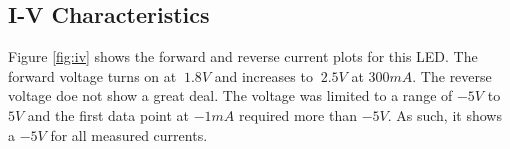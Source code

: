 \subsection{I-V Characteristics}
\label{sec:test:iv}

%



Figure \ref{fig:iv} shows the forward and reverse current plots for this LED. The forward voltage turns on at $~1.8V$ and increases to $~2.5V$ at $300mA$. The reverse voltage doe not show a great deal. The voltage was limited to a range of $-5V$ to $5V$ and the first data point at $-1mA$ required more than $-5V$. As such, it shows a $-5V$ for all measured currents.
